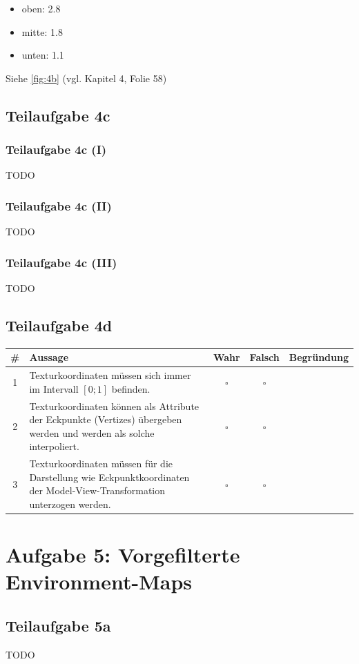 \documentclass[a4paper]{scrartcl}
\begin{document}
\begin{itemize}
    \item oben: 2.8
    \item mitte: 1.8
    \item unten: 1.1
\end{itemize}

Siehe \cref{fig:4b} (vgl. Kapitel 4, Folie 58)

\subsection*{Teilaufgabe 4c}
\subsubsection*{Teilaufgabe 4c (I)}
TODO
\subsubsection*{Teilaufgabe 4c (II)}
TODO
\subsubsection*{Teilaufgabe 4c (III)}
TODO

\subsection*{Teilaufgabe 4d}
\begin{tabular}{cp{6cm}ccp{5cm}}\toprule
\# & Aussage  & Wahr & Falsch & Begründung \\\midrule
 1 & Texturkoordinaten müssen sich immer im Intervall $[0; 1]$ befinden. & $\square$ & $\square$ & ~ \\
 2 & Texturkoordinaten können als Attribute der Eckpunkte (Vertizes) übergeben werden und werden als solche interpoliert.  & $\square$    & $\square$      & ~          \\
 3 & Texturkoordinaten müssen für die Darstellung wie Eckpunktkoordinaten der Model-View-Transformation unterzogen werden. & $\square$    & $\square$      & ~          \\\bottomrule
\end{tabular}


\section*{Aufgabe 5: Vorgefilterte Environment-Maps}
\subsection*{Teilaufgabe 5a}
TODO
\end{document}
